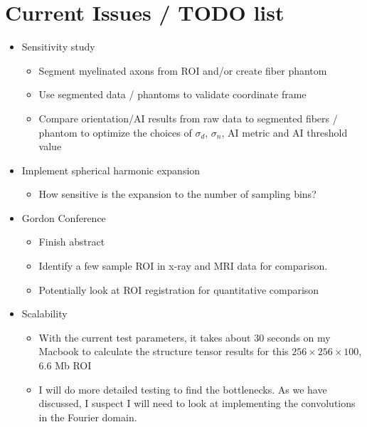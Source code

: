 \documentclass[11pt]{article}
\begin{document}
  
\section{Current Issues / TODO list}
\begin{itemize}
\item Sensitivity study
  \begin{itemize}
  \item Segment myelinated axons from ROI and/or create fiber phantom
  \item Use segmented data / phantoms to validate coordinate frame
  \item Compare orientation/AI results from raw data to segmented fibers /
    phantom to optimize the choices of $\sigma_d$, $\sigma_n$, AI metric and AI
    threshold value
  \end{itemize}
\item Implement spherical harmonic expansion
  \begin{itemize}
  \item How sensitive is the expansion to the number of sampling bins?
  \end{itemize}
\item Gordon Conference
  \begin{itemize}
  \item Finish abstract
  \item Identify a few sample ROI in x-ray and MRI data for comparison.
  \item Potentially look at ROI registration for quantitative comparison
  \end{itemize}
\item Scalability
  \begin{itemize}
  \item With the current test parameters, it takes about 30 seconds on my
    Macbook to calculate the structure tensor results for this
    $256\times256\times100$, 6.6 Mb ROI
  \item I will do more detailed testing to find the bottlenecks. As we have
    discussed, I suspect I will need to look at implementing the convolutions in
    the Fourier domain.
  \end{itemize}
\end{itemize}



 
\end{document}

